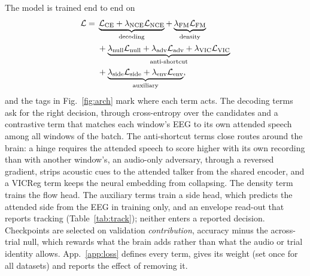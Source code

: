 \documentclass[twoside]{article}
\begin{document}
The model is trained end to end on
\begin{align}
\mathcal L={}&\underbrace{\mathcal L_{\rm CE}+\lambda_{\rm NCE}\mathcal L_{\rm NCE}}_{\text{decoding}}
+\underbrace{\lambda_{\rm FM}\mathcal L_{\rm FM}}_{\text{density}}\nonumber\\
&+\underbrace{\lambda_{\rm null}\mathcal L_{\rm null}+\lambda_{\rm adv}\mathcal L_{\rm adv}
+\lambda_{\rm VIC}\mathcal L_{\rm VIC}}_{\text{anti-shortcut}}\nonumber\\
&+\underbrace{\lambda_{\rm side}\mathcal L_{\rm side}+\lambda_{\rm env}\mathcal L_{\rm env}}_{\text{auxiliary}},
\label{eq:loss}
\end{align}
and the tags in Fig.~\ref{fig:arch} mark where each term acts. The decoding terms ask for
the right decision, through cross-entropy over the candidates and a contrastive term that
matches each window's EEG to its own attended speech among all windows of the batch. The
anti-shortcut terms close routes around the brain: a hinge requires the attended speech to
score higher with its own recording than with another window's, an audio-only adversary,
through a reversed gradient, strips acoustic cues to the attended talker from the shared
encoder, and a VICReg term keeps the neural embedding from collapsing. The density term trains the
flow head. The auxiliary terms train a side head, which predicts the attended side from the
EEG in training only, and an envelope read-out that reports tracking
(Table~\ref{tab:track}); neither enters a reported decision. Checkpoints are selected on
validation \emph{contribution}, accuracy minus the across-trial null, which rewards what the
brain adds rather than what the audio or trial identity allows. App.~\ref{app:loss} defines
every term, gives its weight (set once for all datasets) and reports the effect of removing
it.
\end{document}
